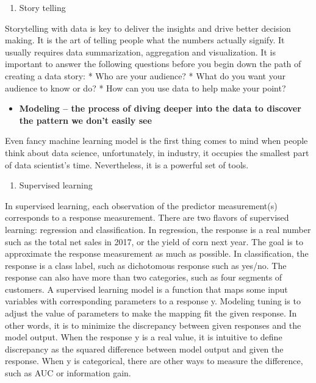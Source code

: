 \documentclass[12pt,]{krantz}
\providecommand{\tightlist}{%
  \setlength{\itemsep}{0pt}\setlength{\parskip}{0pt}}
\theoremstyle{definition}
\theoremstyle{definition}
\theoremstyle{definition}
\theoremstyle{remark}
\begin{document}
\begin{enumerate}
\def\labelenumi{(\arabic{enumi})}
\setcounter{enumi}{2}
\tightlist
\item
  Story telling
\end{enumerate}

Storytelling with data is key to deliver the insights and drive better
decision making. It is the art of telling people what the numbers
actually signify. It usually requires data summarization, aggregation
and visualization. It is important to answer the following questions
before you begin down the path of creating a data story: * Who are your
audience? * What do you want your audience to know or do? * How can you
use data to help make your point?

\begin{itemize}
\tightlist
\item
  \textbf{Modeling -- the process of diving deeper into the data to
  discover the pattern we don't easily see}
\end{itemize}

Even fancy machine learning model is the first thing comes to mind when
people think about data science, unfortunately, in industry, it occupies
the smallest part of data scientist's time. Nevertheless, it is a
powerful set of tools.

\begin{enumerate}
\def\labelenumi{(\arabic{enumi})}
\tightlist
\item
  Supervised learning
\end{enumerate}

In supervised learning, each observation of the predictor measurement(s)
corresponds to a response measurement. There are two flavors of
supervised learning: regression and classification. In regression, the
response is a real number such as the total net sales in 2017, or the
yield of corn next year. The goal is to approximate the response
measurement as much as possible. In classification, the response is a
class label, such as dichotomous response such as yes/no. The response
can also have more than two categories, such as four segments of
customers. A supervised learning model is a function that maps some
input variables with corresponding parameters to a response y. Modeling
tuning is to adjust the value of parameters to make the mapping fit the
given response. In other words, it is to minimize the discrepancy
between given responses and the model output. When the response y is a
real value, it is intuitive to define discrepancy as the squared
difference between model output and given the response. When y is
categorical, there are other ways to measure the difference, such as AUC
or information gain.
\end{document}
